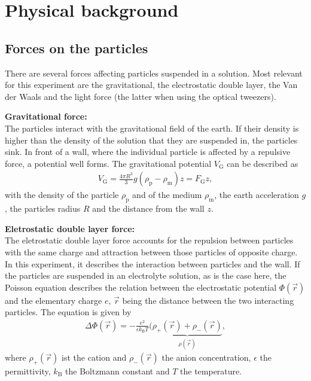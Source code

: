 \documentclass[.../bericht]{subfilies}
\begin{document}
\chapter{Physical background}


  \section{Forces on the particles}
  \label{sec:forces}

    There are several forces affecting particles suspended in a solution. Most relevant for this experiment are the gravitational, the electrostatic double layer, the Van der Waals and the light force (the latter when using the optical tweezers).
    \medskip

    \textbf{Gravitational force:}\\
    The particles interact with the gravitational field of the earth. If their density is higher than the density of the solution that they are suspended in, the particles sink. In front of a wall, where the individual particle is affected by a repulsive force, a potential well forms.  The gravitational potential $V_\mathrm{G}$ can be described as
    \begin{align}
    V_\mathrm{G}=\frac{4\pi R^3}{3}g(\rho_\mathrm{p}-\rho_\mathrm{m})z=F_\mathrm{G}z,
    \end{align}
    with the density of the particle $\rho_\mathrm{p}$ and of the medium $\rho_\mathrm{m}$, the earth acceleration $g$, the particles radius $R$ and the distance from the wall $z$.
    \medskip

    \textbf{Eletrostatic double layer force:}\\
    The eletrostatic double layer force accounts for the repulsion between particles with the same charge and attraction between those particles of opposite charge. In this experiment, it describes the interaction between particles and the wall. If the particles are suspended in an electrolyte solution, as is the case here, the Poisson equation describes the relation between the electrostatic potential $\Phi (\vec{r})$ and the elementary charge $e$, $\vec{r}$ being the distance between the two interacting particles. The equation is given by
    \begin{align*}
    \Delta \Phi (\vec{r})=-\frac{e^2}{\epsilon k_\mathrm{B} T}(\underbrace{\rho_+(\vec{r})+\rho_-(\vec{r})}_{\rho(\vec{r})},
    \end{align*}
    where $\rho_+(\vec{r})$ ist the cation and $\rho_-(\vec{r})$ the anion concentration, $\epsilon$ the permittivity, $k_\mathrm{B}$ the Boltzmann constant and $T$ the temperature.
\end{document}
